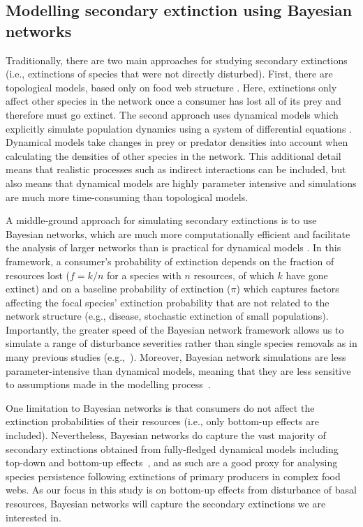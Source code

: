 \documentclass[12pt]{article}
\begin{document}
\begin{spacing}{2.0}
    \subsection*{Modelling secondary extinction using Bayesian networks}


        Traditionally, there are two main approaches for studying secondary extinctions (i.e., extinctions of species that were not directly disturbed). 
        First, there are topological models, based only on food web structure \citep{dunne2009cascading}. 
        Here, extinctions only affect other species in the network once a consumer has lost all of its prey and therefore must go extinct. 
        The second approach uses dynamical models which explicitly simulate population dynamics using a system of differential equations \citep{binzer2011susceptibility}. 
        Dynamical models take changes in prey or predator densities into account when calculating the densities of other species in the network. 
        This additional detail means that realistic processes such as indirect interactions can be included, but also means that dynamical models are highly parameter intensive and simulations are much more time-consuming than topological models. 
        
        
        A middle‐ground approach for simulating secondary extinctions is to use Bayesian networks, which are much more computationally efficient and facilitate the analysis of larger networks than is practical for dynamical models \citep{Eklof2013,Haussler2020}. 
        In this framework, a consumer's probability of extinction depends on the fraction of resources lost ($f = k/n$ for a species with $n$ resources, of which $k$ have gone extinct) and on a baseline probability of extinction ($\pi$) which captures factors affecting the focal species' extinction probability that are not related to the network structure (e.g., disease, stochastic extinction of small populations).
        Importantly, the greater speed of the Bayesian network framework allows us to simulate a range of disturbance severities rather than single species removals as in many previous studies (e.g.,~\citealp[]{Memmott2004,Staniczenko2010,Dunne2004,Cirtwill2022Oikos}).
        Moreover, Bayesian network simulations are less parameter-intensive than dynamical models, meaning that they are less sensitive to assumptions made in the modelling process~\citep{Eklof2013}.

        One limitation to Bayesian networks is that consumers do not affect the extinction probabilities of their resources (i.e., only bottom-up effects are included).
        Nevertheless, Bayesian networks do capture the vast majority of secondary extinctions obtained from fully-fledged dynamical models including top-down and bottom-up effects~\citep{Eklof2013}, and as such are a good proxy for analysing species persistence following extinctions of primary producers in complex food webs.
        As our focus in this study is on bottom-up effects from disturbance of basal resources, Bayesian networks will capture the secondary extinctions we are interested in.


\end{spacing}
\end{document}
